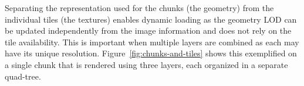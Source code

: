 \documentclass[journal]{vgtc}                %
\newcommand{\kallecomment}[1]{\textbf{[-Kalle-~}
    \textcolor{orange}{#1}
    \textbf{~]}}
\newcommand{\emilcomment}[1]{\textbf{[-Emil-~}
    \textcolor{red}{#1}
    \textbf{~]}}
\newcommand{\plgrem}[1]{\textcolor{blue}{~\textbf{!!}~}}
\newcommand{\fig}[1]{Figure~\ref{fig:#1}}
\begin{document}
Separating the representation used for the chunks (the geometry) from the individual tiles (the textures) enables dynamic loading as the geometry LOD can be updated independently from the image information and does not rely on the tile availability.
This is important when multiple layers are combined as each may have its unique resolution.
\fig{chunks-and-tiles} shows this exemplified on a single chunk that is rendered using three layers, each organized in a separate quad-tree.

% 
% 
% 
% 
% 
% 
% 
\end{document}
